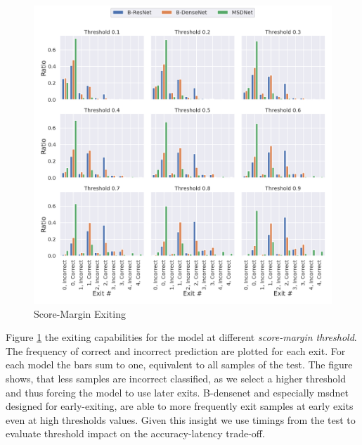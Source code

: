 \begin{figure}
	\centering
	\includegraphics[width=\linewidth]{figures/threshold_plots/inference_threshold_test}
	\caption{Score-Margin Exiting}
	\label{fig:inferencethresholdtest}
\end{figure}

Figure \ref{fig:inferencethresholdtest} the exiting capabilities for the model at different \emph{score-margin threshold}. The frequency of correct and incorrect prediction are plotted for each exit. For each model the bars sum to one, equivalent to all samples of the test. The figure shows, that less samples are incorrect classified, as we select a higher threshold and thus forcing the model to use later exits. B-\gls{densenet} and especially \gls{msdnet}  designed for early-exiting, are able to more frequently exit samples at early exits even at high thresholds values. Given this insight we use timings from the test to evaluate threshold impact on the accuracy-latency trade-off.


